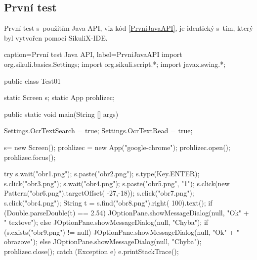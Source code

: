 \documentclass{bakalarka}
\begin{document}
		\subsection{První test}
		První test s~použitím Java API, viz kód \ref{PrvniJavaAPI}, je identický s~tím, který byl vytvořen pomocí SikuliX-IDE.
		\begin{lstjava}{caption={První test Java API}, label={PrvniJavaAPI}}
import org.sikuli.basics.Settings;
import org.sikuli.script.*;
import javax.swing.*;

public class Test01 {

  static Screen s;
  static App prohlizec;
  
  public static void main(String [] args) {
    Settings.OcrTextSearch = true;
    Settings.OcrTextRead = true;

    s= new Screen();
    prohlizec = new App("google-chrome");
    prohlizec.open();
    prohlizec.focus();
    
    try {
      s.wait("obr1.png");
      s.paste("obr2.png");
      s.type(Key.ENTER);
      s.click("obr3.png");
      s.wait("obr4.png");
      s.paste("obr5.png", "1");
      s.click(new Pattern("obr6.png").targetOffset(
        -27,-18));
      s.click("obr7.png");
      s.click("obr4.png");
      String t = s.find("obr8.png").right(
        100).text();
      if (Double.parseDouble(t) == 2.54) {
        JOptionPane.showMessageDialog(null, "Ok" +
          " textove");
      } else {
        JOptionPane.showMessageDialog(null, "Chyba");
      }
      if (s.exists("obr9.png") != null) {
        JOptionPane.showMessageDialog(null, "Ok" +
          " obrazove");
      } else {
        JOptionPane.showMessageDialog(null, "Chyba");
      }
      prohlizec.close();
    } catch (Exception e) {
      e.printStackTrace();
    }
  }
}
		\end{lstjava}
	
\end{document}
